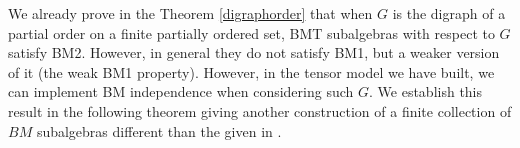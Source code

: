 \documentclass[a4paper,12pt]{extarticle}
\theoremstyle{definition}
\theoremstyle{remark}
\begin{document}



We already prove in the Theorem \ref{digraphorder} that when $G$ is the digraph of a partial order on a finite partially ordered set, BMT subalgebras with respect to $G$ satisfy BM2. However, in general they do not satisfy BM1, but a weaker version of it (the weak BM1 property). However, in the tensor model we have built, we can implement BM independence when considering such $G$. We establish this result in the following theorem giving another construction of a finite collection of $BM$ subalgebras different than the given in \cite{BM2007}.
\end{document}
